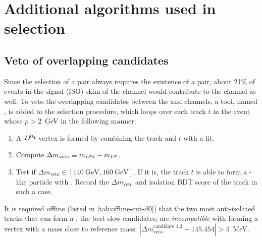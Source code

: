 \section{Additional algorithms used in selection}
\label{ref:sel:algo}


\subsection{Veto of overlapping candidates}
\label{ref:sel:algo:veto}

Since the selection of a \Dstar\muon pair always requires the existence
of a \Dz\muon pair,
about 21\% of events in the signal (ISO) skim of the \Dstar channel
would contribute to the \Dz channel as well.
%
To veto the overlapping candidates between the \Dz and \Dstar channels,
a tool, named ,
is added to the selection procedure, which loops over each track $t$
in the event whose $p > 2$~GeV in the following manner:

\begin{enumerate}
    \item A ${{D}^0} t$ vertex is formed by combining the \Dz track and $t$ with
        a fit.
    \item Compute $\Delta m_\text{veto} \equiv m_{{{D}^0} t} - m_{{D}^0}$.
    \item Test if $\Delta m_\text{veto} \in [140~\text{GeV}, 160~\text{GeV}]$.
        If it is, the track $t$ is able to form a \Dstar-like particle with \Dz.
        Record the $\Delta m_\text{veto}$ and isolation BDT score
        of the track in such a case.
\end{enumerate}

It is required offline (listed in \cref{tab:offline-cut-d0})
that the two most anti-isolated tracks that can form a \Dstar,
the best slow \pion candidates,
are \emph{incompatible} with
forming a \Dz\pion vertex with a mass close to \Dstar reference mass:
$|\Delta m_\text{veto}^\text{candidate 1,2} - 145.454| > 4$~MeV.

